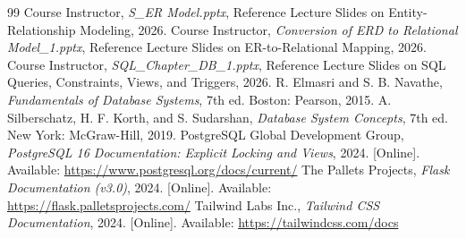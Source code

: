 \documentclass[12pt,a4paper]{report}
\begin{document}
\begin{thebibliography}{99}
     Course Instructor, \textit{S\_ER Model.pptx}, Reference Lecture Slides on Entity-Relationship Modeling, 2026.
     Course Instructor, \textit{Conversion of ERD to Relational Model\_1.pptx}, Reference Lecture Slides on ER-to-Relational Mapping, 2026.
     Course Instructor, \textit{SQL\_Chapter\_DB\_1.pptx}, Reference Lecture Slides on SQL Queries, Constraints, Views, and Triggers, 2026.
     R. Elmasri and S. B. Navathe, \textit{Fundamentals of Database Systems}, 7th ed. Boston: Pearson, 2015.
     A. Silberschatz, H. F. Korth, and S. Sudarshan, \textit{Database System Concepts}, 7th ed. New York: McGraw-Hill, 2019.
     PostgreSQL Global Development Group, \textit{PostgreSQL 16 Documentation: Explicit Locking and Views}, 2024. [Online]. Available: \url{https://www.postgresql.org/docs/current/}
     The Pallets Projects, \textit{Flask Documentation (v3.0)}, 2024. [Online]. Available: \url{https://flask.palletsprojects.com/}
     Tailwind Labs Inc., \textit{Tailwind CSS Documentation}, 2024. [Online]. Available: \url{https://tailwindcss.com/docs}
\end{thebibliography}
\end{document}
